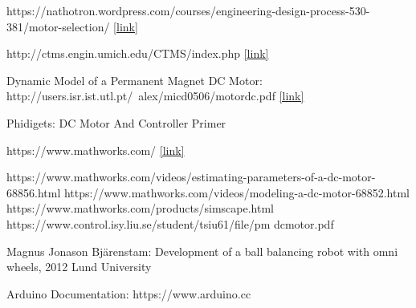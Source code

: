 \documentclass[12pt,english]{article}
\begin{document}
\begin{thebibliography}{1}
  https://nathotron.wordpress.com/courses/engineering-design-process-530-381/motor-selection/ \href{ https://nathotron.wordpress.com/courses/engineering-design-process-530-381/motor-selection/}{[link]}

  http://ctms.engin.umich.edu/CTMS/index.php \href{ http://ctms.engin.umich.edu/CTMS/index.php}{[link]}

  Dynamic Model of a Permanent Magnet DC Motor: http://users.isr.ist.utl.pt/~alex/micd0506/motordc.pdf \href{ http://users.isr.ist.utl.pt/~alex/micd0506/motordc.pdf}{[link]}

 Phidigets: DC Motor And Controller Primer

  https://www.mathworks.com/ \href{ https://www.mathworks.com/}{[link]}

 https://www.mathworks.com/videos/estimating-parameters-of-a-dc-motor-68856.html
 https://www.mathworks.com/videos/modeling-a-dc-motor-68852.html
 https://www.mathworks.com/products/simscape.html
 https://www.control.isy.liu.se/student/tsiu61/file/pm dcmotor.pdf

 Magnus Jonason Bjärenstam: Development of a ball balancing robot
with omni wheels, 2012 Lund University

 Arduino Documentation: https://www.arduino.cc



\end{thebibliography}
\end{document}
